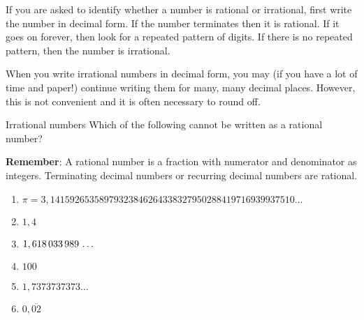 If you are asked to identify whether a number is rational or irrational, first write the number in decimal form. If the number terminates then it is rational. If it goes on forever, then look for a repeated pattern of digits. If there is no repeated pattern, then the number is irrational.\par 
When you write irrational numbers in decimal form, you may (if you have a lot of time and paper!) continue writing them for many, many decimal places. However, this is not convenient and it is often necessary to round off.\par 



\begin{activity}{Irrational numbers }
\nopagebreak
Which of the following cannot be
written as a rational number?\par \vspace{0.5cm}
\textbf{Remember}: A rational number is a fraction with numerator and denominator as integers. Terminating decimal numbers or recurring decimal numbers are rational.\par 
\begin{enumerate}[itemsep=5pt, label=\textbf{\arabic*}. ] 
\item $\pi =3,14159265358979323846264338327950288419716939937510\ldots$
\item $1,4$
\item $1,618\phantom{\rule{0.166667em}{0ex}}033\phantom{\rule{0.166667em}{0ex}}989\phantom{\rule{0.166667em}{0ex}}\ldots$
\item $100$
\item $1,7373737373\ldots$
\item $0,\overline{02}$
\end{enumerate}
\end{activity}


